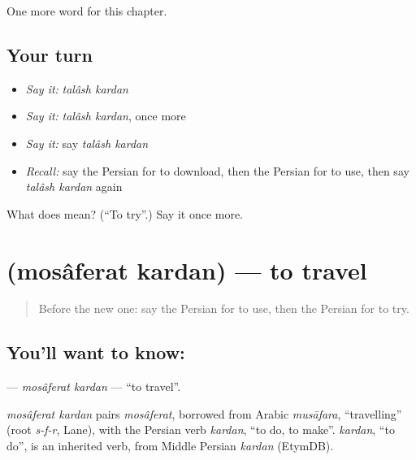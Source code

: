 \begin{grammarlens}[title={What you've built}]
One more word for this chapter.
\end{grammarlens}

\subsection*{Your turn}
\begin{itemize}
\raggedright
  \item \emph{Say it:} \emph{talâsh kardan}
  \item \emph{Say it:} \emph{talâsh kardan}, once more
  \item \emph{Say it:} say \emph{talâsh kardan}
  \item \emph{Recall:} say the Persian for to download, then the Persian for to use, then say \emph{talâsh kardan} again
\end{itemize}

\begin{tcolorbox}[breakable,colback=teal!4,colframe=teal!35!black,title={Before you move on}]
What does   mean? (\textquotedblleft{}To try\textquotedblright{}.) Say it once more.
\end{tcolorbox}
\section[\texorpdfstring{\fa{مسافرت} \fa{کردن} (mosâferat kardan)}{مسافرت کردن (mosâferat kardan)}]{  (mosâferat kardan) — to travel}

\label{lesson:FA-C256-mosaferat-kardan}



\begin{quote}
Before the new one: say the Persian for to use, then the Persian for to try.
\end{quote}

\subsection*{You'll want to know:  }
\textbf{ } — \emph{mosâferat kardan} — \textquotedblleft{}to travel\textquotedblright{}.

\begin{cousinweb}
\emph{mosâferat kardan} pairs \emph{mosâferat}, borrowed from Arabic \emph{musāfara}, \textquotedblleft{}travelling\textquotedblright{} (root \emph{s-f-r}, Lane), with the Persian verb \emph{kardan}, \textquotedblleft{}to do, to make\textquotedblright{}. \emph{kardan}, \textquotedblleft{}to do\textquotedblright{}, is an inherited verb, from Middle Persian \emph{kardan} (EtymDB).
\end{cousinweb}

